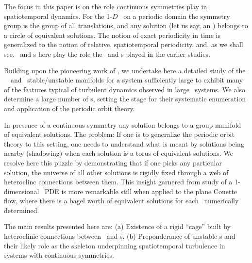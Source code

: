 The focus in this paper is on the role continuous symmetries
play in spatiotemporal dynamics. For the 1-$D$ \KS\ on a periodic domain
the symmetry group is the group of all translations, and
any solution (let us say, an \eqv) belongs to a circle of equivalent
solutions. The notion of exact periodicity in time is 
generalized to the notion of relative, spatiotemporal periodicity, and,
as we shall see, 
\reqva\ and \rpo s here play the role the \eqva\ and
\po s played in the earlier studies. 

Building upon the pioneering work of
, we undertake here a detailed study of the 
\KS\ \eqva\ and \reqva\ stable/unstable manifolds
for a system sufficiently large to exhibit many of
the features typical of turbulent dynamics observed in large \KS\ systems.
We also determine a large number of \rpo s, setting the
stage for their systematic enumeration and application 
of the periodic orbit theory.

In presence of a continuous symmetry any solution belongs to a 
group manifold of equivalent solutions. The problem: If one is to generalize
the periodic orbit theory to this setting, one needs to understand what
is meant by solutions being nearby (shadowing) when each solution is
a torus of equivalent solutions. 
We resolve here this puzzle by demonstrating that if one picks
any particular solution, the universe of all other solutions is
rigidly fixed through a web of heteroclinc connections between them.
This insight garnered from study of a
1-dimensional \KS\ PDE is more remarkable still when applied to
the plane Couette flow, where there
is a bagel worth of equivalent solutions for each \eqv\ numerically determined.


The main results presented here are:
(a) Existence of a rigid ``cage'' built by heteroclinic connections
between \eqva\ and \po s.
(b) Preponderance of unstable \rpo s and their likely
role as the skeleton underpinning spatiotemporal turbulence in
systems with continuous symmetries. 



